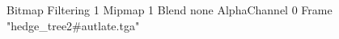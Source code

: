 {Bitmap
	{Filtering 1}
	{Mipmap 1}
	{Blend none}
	{AlphaChannel 0}
	{Frame "hedge_tree2#autlate.tga"}
}
